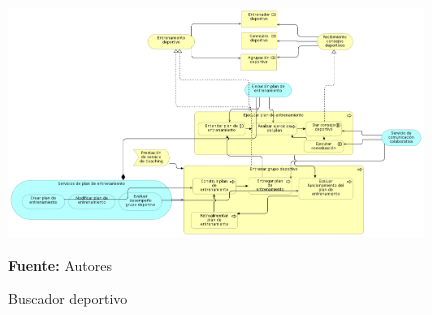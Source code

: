 \begin{figure}[!htb]
  \begin{center}
    \includegraphics[width=11cm]{./imagenes/business_process/entrenamientodeportivo.png}
    \caption{Buscador deportivo}
    \label{fig:BF_BuscadorDeportivo}
    \textbf{Fuente:}  Autores
  \end{center}
\end{figure}

